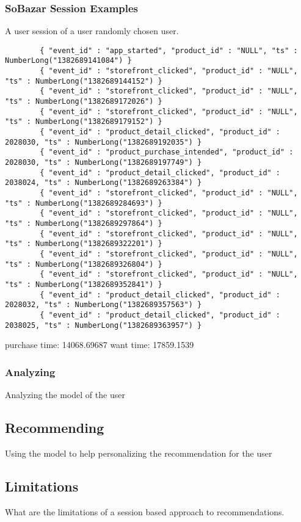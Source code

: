 \subsubsection{SoBazar Session Examples} %
    \label{par:session_examples}
    A user session of a user randomly chosen user.
    \begin{lstlisting}
        { "event_id" : "app_started", "product_id" : "NULL", "ts" : NumberLong("1382689141084") }
        { "event_id" : "storefront_clicked", "product_id" : "NULL", "ts" : NumberLong("1382689144152") }
        { "event_id" : "storefront_clicked", "product_id" : "NULL", "ts" : NumberLong("1382689172026") }
        { "event_id" : "storefront_clicked", "product_id" : "NULL", "ts" : NumberLong("1382689179152") }
        { "event_id" : "product_detail_clicked", "product_id" : 2028030, "ts" : NumberLong("1382689192035") }
        { "event_id" : "product_purchase_intended", "product_id" : 2028030, "ts" : NumberLong("1382689197749") }
        { "event_id" : "product_detail_clicked", "product_id" : 2038024, "ts" : NumberLong("1382689263384") }
        { "event_id" : "storefront_clicked", "product_id" : "NULL", "ts" : NumberLong("1382689284693") }
        { "event_id" : "storefront_clicked", "product_id" : "NULL", "ts" : NumberLong("1382689297864") }
        { "event_id" : "storefront_clicked", "product_id" : "NULL", "ts" : NumberLong("1382689322201") }
        { "event_id" : "storefront_clicked", "product_id" : "NULL", "ts" : NumberLong("1382689326804") }
        { "event_id" : "storefront_clicked", "product_id" : "NULL", "ts" : NumberLong("1382689352841") }
        { "event_id" : "product_detail_clicked", "product_id" : 2028032, "ts" : NumberLong("1382689357563") }
        { "event_id" : "product_detail_clicked", "product_id" : 2038025, "ts" : NumberLong("1382689363957") }
    \end{lstlisting}

    purchase time: 14068.69687
    want time: 17859.1539


\subsubsection{Analyzing}
    Analyzing the model of the user

\subsection{Recommending}
    Using the model to help personalizing the recommendation for the user

\subsection{Limitations}
    What are the limitations of a session based approach to recommendations.

